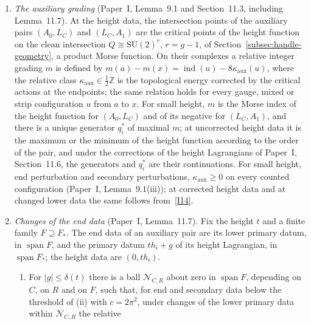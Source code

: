 \documentclass[11pt]{amsart}
\theoremstyle{definition}
\theoremstyle{remark}
\theoremstyle{plain}
\numberwithin{equation}{section}
\newcommand{\ZZ}{\mathbb Z}
\newcommand{\SU}{\mathrm{SU}}
\newcommand{\ad}{\operatorname{ad}}
\newcommand{\ind}{\operatorname{ind}}
\begin{document}
\begin{enumerate}[label=(I\arabic*),ref=(I\arabic*)]
$g^*A=\alpha+b+\phi_1\,dz_1+\phi_2\,dz_2$, where $b(z)$ is a one-form on the fibre with
$d_\alpha^*b(z)=0$ and $\|b(z)\|_{C^0(T)}\le C_0e_T$, and the $\phi_j(z)$ are sections of $\ad$ on
the fibre. The connection $g^*A$ is the \emph{torus-fibre slice} of $A$. If in addition the
curvature is small in $C^{k+1}$, the fibrewise Sobolev norms of $b$, $\phi$ and their base
derivatives are bounded by those of the curvature on the fibre.
\item\label{I13} \emph{The auxiliary grading} (Paper~I, Lemma~9.1 and Section~11.3, including
Lemma~11.7). At the height data, the intersection points of the auxiliary pairs $(A_0,L_C)$ and
$(L_C,A_1)$ are the critical points of the height function on the clean intersection
$Q\cong\SU(2)^r$, $r=g-1$, of Section~\ref{subsec:handle-geometry}, a product Morse function. On
their complexes a relative integer grading $m$ is defined by
$m(a)-m(x)=\ind(u)-8\kappa_{\mathrm{aux}}(u)$, where the relative class
$\kappa_{\mathrm{aux}}\in\tfrac12\ZZ$ is the topological energy corrected by the critical actions
at the endpoints; the same relation holds for every gauge, mixed or strip configuration $u$ from $a$
to $x$. For small height, $m$ is the Morse index of the height function for $(A_0,L_C)$ and of its
negative for $(L_C,A_1)$, and there is a unique generator $q_i^*$ of maximal $m$; at uncorrected
height data it is the maximum or the minimum of the height function according to the order of the
pair, and under the corrections of the height Lagrangians of Paper~I, Section~11.6, the generators
and $q_i^*$ are their continuations. For small height, end
perturbation and secondary perturbations, $\kappa_{\mathrm{aux}}\ge0$ on every counted
configuration (Paper~I, Lemma~9.1(iii)); at corrected height data and at changed lower data the
same follows from~\ref{I14}.
\item\label{I14} \emph{Changes of the end data} (Paper~I, Lemma~11.7). Fix the height $t$ and a
finite family $F\supseteq F_*$. The end data of an auxiliary pair are its lower primary datum, in
$\operatorname{span}F$, and the primary datum $th_i+g$ of its height Lagrangian, in
$\operatorname{span}F_*$; the height data are $(0,th_i)$.
\begin{enumerate}[label=(\roman*)]
\item For $|g|\le\delta(t)$ there is a
ball $\mathcal N_{C,R}$ about zero in $\operatorname{span}F$, depending on $C$, on $R$ and
on $F$, such that, for end and secondary data below the threshold of (ii) with $c=2\pi^2$, under
changes of the lower primary data within $\mathcal N_{C,R}$ the relative

\end{enumerate}
\end{enumerate}
\end{document}
